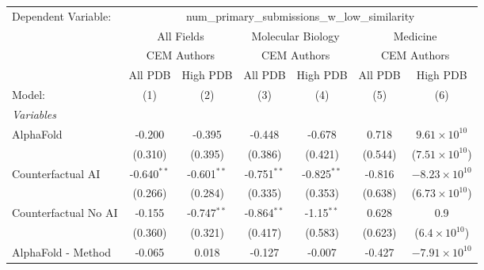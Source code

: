 \begingroup
\centering
\begin{tabular}{lcccccc}
   \tabularnewline \midrule \midrule
   Dependent Variable: & \multicolumn{6}{c}{num\_primary\_submissions\_w\_low\_similarity}\\
 & \multicolumn{2}{c}{All Fields} & \multicolumn{2}{c}{Molecular Biology} & \multicolumn{2}{c}{Medicine} \\
\cmidrule(lr){2-3} \cmidrule(lr){4-5} \cmidrule(lr){6-7}
 & \multicolumn{2}{c}{CEM Authors} & \multicolumn{2}{c}{CEM Authors} & \multicolumn{2}{c}{CEM Authors} \\
\cmidrule(lr){2-3} \cmidrule(lr){4-5} \cmidrule(lr){6-7}
 & \multicolumn{1}{c}{All PDB} & \multicolumn{1}{c}{High PDB} & \multicolumn{1}{c}{All PDB} & \multicolumn{1}{c}{High PDB} & \multicolumn{1}{c}{All PDB} & \multicolumn{1}{c}{High PDB} \\
\cmidrule(lr){2-2} \cmidrule(lr){3-3} \cmidrule(lr){4-4} \cmidrule(lr){5-5} \cmidrule(lr){6-6} \cmidrule(lr){7-7}
   Model:                                                     & (1)           & (2)           & (3)           & (4)           & (5)           & (6)\\  
   \midrule
   \emph{Variables}\\
   AlphaFold                                                  & -0.200        & -0.395        & -0.448        & -0.678        & 0.718         & $9.61\times 10^{10}$\\    
                                                              & (0.310)       & (0.395)       & (0.386)       & (0.421)       & (0.544)       & ($7.51\times 10^{10}$)\\    
   Counterfactual AI                                          & -0.640$^{**}$ & -0.601$^{**}$ & -0.751$^{**}$ & -0.825$^{**}$ & -0.816        & $-8.23\times 10^{10}$\\    
                                                              & (0.266)       & (0.284)       & (0.335)       & (0.353)       & (0.638)       & ($6.73\times 10^{10}$)\\    
   Counterfactual No AI                                       & -0.155        & -0.747$^{**}$ & -0.864$^{**}$ & -1.15$^{**}$  & 0.628         & 0.9\\   
                                                              & (0.360)       & (0.321)       & (0.417)       & (0.583)       & (0.623)       & ($6.4\times 10^{10}$)\\    
   AlphaFold - Method                                         & -0.065        & 0.018         & -0.127        & -0.007        & -0.427        & $-7.91\times 10^{10}$\\    

\end{tabular}
